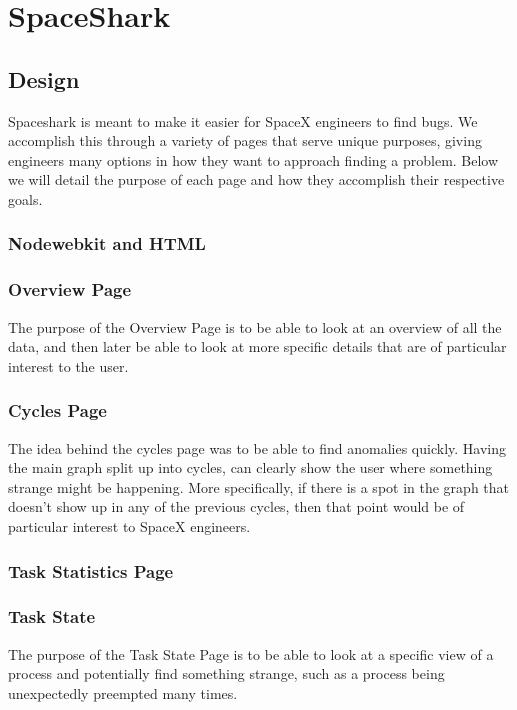 \documentclass{hmcclinic}
\begin{document}
\chapter{SpaceShark}
\section{Design} %

  Spaceshark is meant to make it easier for SpaceX engineers to find bugs. We
  accomplish this through a variety of pages that serve unique purposes, giving
  engineers many options in how they want to approach finding a problem. Below
  we will detail the purpose of each page and how they accomplish their
  respective goals.

  \subsection{Nodewebkit and HTML} %
  \subsection{Overview Page}
  
The purpose of the Overview Page is to be able to look at an overview of all the data, and then later be able to look at more specific details that are of particular interest to the user.
  
  \subsection{Cycles Page}
  
The idea behind the cycles page was to be able to find anomalies quickly. Having the main graph split up into cycles, can clearly show the user where something strange might be happening. More specifically, if there is a spot in the graph that doesn't show up in any of the previous cycles, then that point would be of particular interest to SpaceX engineers.
  
  \subsection{Task Statistics Page}
  \subsection{Task State}
  
The purpose of the Task State Page is to be able to look at a specific view of a process and potentially find something strange, such as a process being unexpectedly preempted many times.
  
\end{document}
